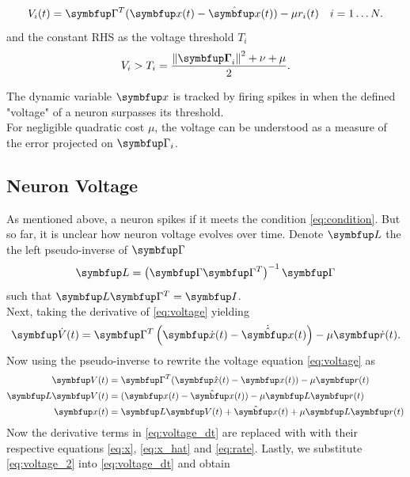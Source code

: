 \begin{equation}\label{eq:voltage}
V_i(t)=\bmu{\Gamma}^T(\bmu{x}(t)-\hat{\bmu{x}}(t))-\mu r_i(t)
\quad i  = 1\dots N.
\end{equation}
and the constant \ac{RHS} as the voltage threshold $T_i$
\begin{equation}\label{eq:condition}
V_i>T_i=\frac{\left\|\boldsymbol{\bmu{\Gamma}}_i\right\|^2 + \nu+\mu}{2}.
\end{equation}

The dynamic variable $\bmu{x}$ is tracked by firing spikes in when the defined "voltage" of a neuron surpasses its threshold.\\
For negligible quadratic cost $\mu$, the voltage can be understood as a measure of the error projected on $\bmu{\Gamma}_i$.
\subsection{Neuron Voltage}
As mentioned above, a neuron spikes if it meets the condition \cref{eq:condition}. But so far, it is unclear how neuron voltage evolves over time.
Denote $\bmu{L}$ the the left pseudo-inverse of $\bmu{\Gamma}$
\begin{equation}
\bmu{L} = \left(\bmu{\Gamma}\bmu{\Gamma}^T\right)^{-1}\bmu{\Gamma}
\end{equation}
such that $\bmu{L}\bmu{\Gamma}^T = \bmu{I}$.\\
Next, taking the derivative of \cref{eq:voltage} yielding
\begin{equation}\label{eq:voltage_dt}
\bmu{\dot{V}}(t)=\bmu{\Gamma}^T\left(\bmu{\dot{x}}(t)-\dot{\hat{\bmu{x}}}(t)\right)-\mu \bmu{\dot{r}}(t).
\end{equation}
Now using the pseudo-inverse to rewrite the voltage equation \cref{eq:voltage} as
\begin{equation}\label{eq:voltage_2}
\begin{aligned}
\bmu{V}(t)&=\bmu{\Gamma}^T(\bmu{\hat{x}}(t)-\bmu{x}(t))-\mu \bmu{r}(t)\\
\bmu{L}\bmu{V}(t)&=(\bmu{x}(t)-\hat{\bmu{x}}(t))-\mu \bmu{L}\bmu{r}(t)\\
\bmu{x}(t)&=\bmu{L}\bmu{V}(t)  + \hat{\bmu{x}}(t) + \mu \bmu{L}\bmu{r}(t)\\
\end{aligned}
\end{equation}
Now the derivative terms in \cref{eq:voltage_dt} are replaced with  with their respective equations \cref{eq:x}, \cref{eq:x_hat} and \cref{eq:rate}. Lastly, we substitute \cref{eq:voltage_2} into \cref{eq:voltage_dt} and obtain
